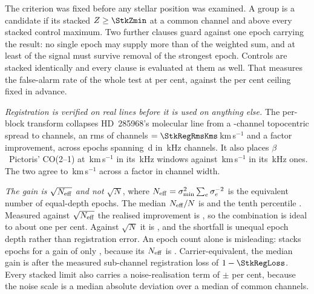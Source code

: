 The criterion was fixed before any stellar position was examined. A group is
a candidate if its stacked $Z\ge\StkZmin$ at a common channel and above every
stacked control maximum. Two further clauses guard against
one epoch carrying the result: no single epoch may supply more than
\StkDomMax{} of the weighted sum, and at least \StkJkMin{} of the signal
must survive removal of the strongest epoch. Controls are stacked
identically and every clause is evaluated at them as well. That measures the
false-alarm rate of the whole test at \StkCtrlFap{} per cent, against the
\StkFapCeil{} per cent ceiling fixed in advance.

\emph{Registration is verified on real lines before it is used on anything
else.} The per-block transform collapses HD~285968's molecular line from a
\StkRegTopoChan-channel topocentric spread to \StkRegStellarChan{}
channels, an rms of \StkRegRmsChan{} channels $=\StkRegRmsKms$\,km\,s$^{-1}$
and a factor \StkRegFactor{} improvement, across \StkRegNEpoch{} epochs
spanning \StkRegSpanD\,d in \StkRegChanKHz\,kHz channels. It also places
$\beta$~Pictoris' CO(2--1) at \StkRegBpVsf\,km\,s$^{-1}$ in its
\StkRegBpChanA\,kHz windows against \StkBpCoTwoOff\,km\,s$^{-1}$ in its
\StkRegBpChanB\,kHz ones. The two agree to \StkRegCrossKms\,km\,s$^{-1}$
across a factor \StkRegBpChanRatio{} in channel width.

\emph{The gain is $\sqrt{N_{\rm eff}}$ and not $\sqrt{N}$}, where
$N_{\rm eff}=\sigma_{\min}^{2}\sum_e\sigma_e^{-2}$ is the equivalent number
of equal-depth epochs. The median $N_{\rm eff}/N$ is \StkNeffFrac{} and the
tenth percentile \StkNeffFracPTen. Measured against $\sqrt{N_{\rm eff}}$ the
realised improvement is \StkGainVsNeff, so the combination is ideal to about
one per cent. Against $\sqrt{N}$ it is \StkGainVsN, and the shortfall is
unequal epoch depth rather than registration error. An epoch count alone is
misleading: \StkWorstStar{} stacks \StkWorstN{} epochs for a gain of only
\StkWorstGain, because its $N_{\rm eff}$ is \StkWorstNeff.
Carrier-equivalent, the median gain is \StkCarrierGainMed{} after the
measured sub-channel registration loss of $1-\StkRegLoss$. Every stacked
limit also carries a noise-realisation term of $\pm$\StkMadZScatterPct{} per
cent, because the noise scale is a median absolute deviation over a median of
\StkNChanMed{} common channels.

